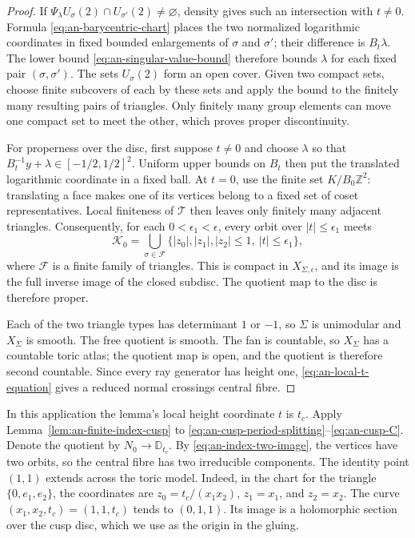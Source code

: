 \documentclass[11pt]{article}
\theoremstyle{definition}
\theoremstyle{remark}
\numberwithin{equation}{section}
\newcommand{\ZZ}{\mathbb Z}
\begin{document}
\begin{proof}
If
$\Psi_\lambda U_\sigma(2)\cap U_{\sigma'}(2)\ne\varnothing$, density
gives such an intersection with $t\ne0$.  Formula
\eqref{eq:an-barycentric-chart} places the two normalized logarithmic
coordinates in
fixed bounded enlargements of $\sigma$ and $\sigma'$; their difference
is $B_t\lambda$.  The lower bound
\eqref{eq:an-singular-value-bound} therefore bounds $\lambda$ for each
fixed pair $(\sigma,\sigma')$.  The sets $U_\sigma(2)$ form an open
cover.  Given two compact sets, choose
finite subcovers of each by these sets and apply the bound to the finitely
many resulting pairs of triangles.  Only finitely many group elements can
move one compact set to meet the other, which proves proper discontinuity.

For properness over the disc, first suppose $t\ne0$ and choose
$\lambda$ so that
$B_t^{-1}y+\lambda\in[-1/2,1/2]^2$.
Uniform upper bounds on $B_t$ then put the translated logarithmic coordinate
in a fixed ball.  At $t=0$, use the finite set
$K/B_0\ZZ^2$: translating a face makes one of its vertices belong to a
fixed set of coset representatives.  Local finiteness of $\mathcal T$
then leaves only finitely many adjacent triangles.  Consequently, for each
$0<\epsilon_1<\epsilon$, every orbit over
$|t|\leq\epsilon_1$ meets
\begin{equation*}
 \mathcal K_0=
 \bigcup_{\sigma\in\mathcal F}
 \{|z_0|,|z_1|,|z_2|\leq1,\ |t|\leq\epsilon_1\},
\end{equation*}
where $\mathcal F$ is a finite family of triangles.  This is compact in
$X_{\Sigma,\epsilon}$, and its image is the full inverse image of the
closed subdisc.  The quotient map to the disc is therefore proper.

Each of the two triangle types has determinant $1$ or $-1$, so
$\Sigma$ is unimodular and $X_\Sigma$ is smooth.  The free quotient is
smooth.  The fan is countable, so $X_\Sigma$ has a countable toric atlas;
the quotient map is open, and the quotient is therefore second countable.
Since every ray generator has height one,
\eqref{eq:an-local-t-equation} gives a reduced normal crossings central
fibre.
\end{proof}

In this application the lemma's local height coordinate $t$ is
$t_c$.  Apply Lemma~\ref{lem:an-finite-index-cusp} to
\eqref{eq:an-cusp-period-splitting}--\eqref{eq:an-cusp-C}.  Denote the
quotient by $N_0\to\mathbb D_{t_c}$.
By \eqref{eq:an-index-two-image}, the vertices have two orbits, so the
central fibre has two irreducible components.  The identity point
$(1,1)$ extends across the toric model.  Indeed, in the chart for the
triangle $\{0,e_1,e_2\}$, the coordinates are
$z_0=t_c/(x_1x_2)$, $z_1=x_1$, and $z_2=x_2$.
The curve $(x_1,x_2,t_c)=(1,1,t_c)$ tends to $(0,1,1)$.  Its image
is a holomorphic section over the cusp disc, which we use as the origin in
the gluing.
\end{document}
